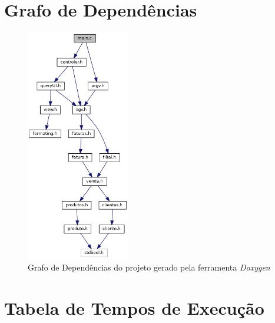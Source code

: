 \documentclass[a4paper]{report}
\begin{document}
\chapter{Grafo de Dependências}
\begin{figure}[H]
    \begin{center}
        \includegraphics[width=0.4\textwidth]{dependency.png}\par
        \caption{Grafo de Dependências do projeto gerado pela ferramenta \textit{Doxygen}}
    \end{center}
\end{figure}

\chapter{Tabela de Tempos de Execução}
\end{document}
